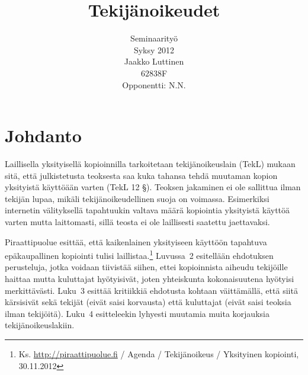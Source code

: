 \documentclass[titlepage,12pt]{article}
\title{Tekijänoikeudet}
\author{
  Seminaarityö\\
  \hfill Syksy 2012\\
  Jaakko Luttinen\\
  $62838$F\\
  Opponentti: N.N.
}
\date{ }
\begin{document}
\renewcommand\refname{Lähteet}
\renewcommand\bibname{Lähteet}

\nocite{*}

\maketitle

\tableofcontents



\pagebreak


\section{Johdanto}


Laillisella yksityisellä kopioinnilla tarkoitetaan tekijänoikeuslain
(TekL) mukaan sitä, että julkistetusta teoksesta saa kuka tahansa
tehdä muutaman kopion yksityistä käyttöään varten (TekL 12 §). Teoksen
jakaminen ei ole sallittua ilman tekijän lupaa, mikäli
tekijänoikeudellinen suoja on voimassa.  Esimerkiksi internetin
välityksellä tapahtuukin valtava määrä kopiointia yksityistä käyttöä
varten mutta laittomasti, sillä teosta ei ole laillisesti saatettu
jaettavaksi.



Piraattipuolue esittää, että kaikenlainen yksityiseen käyttöön
tapahtuva epäkaupallinen kopiointi tulisi
laillistaa.\footnote{Ks. \url{http://piraattipuolue.fi} / Agenda /
  Tekijänoikeus / Yksityinen kopiointi, 30.11.2012} Luvussa~2
esitellään ehdotuksen perusteluja, jotka voidaan tiivistää siihen,
ettei kopioinnista aiheudu tekijöille haittaa mutta kuluttajat
hyötyisivät, joten yhteiskunta kokonaisuutena hyötyisi merkittävästi.
Luku~3 esittää kritiikkiä ehdotusta kohtaan väittämällä, että siitä
kärsisivät sekä tekijät (eivät saisi korvausta) että kuluttajat (eivät
saisi teoksia ilman tekijöitä).  Luku~4 esitteleekin lyhyesti muutamia
muita korjauksia tekijänoikeuslakiin.


\end{document}
